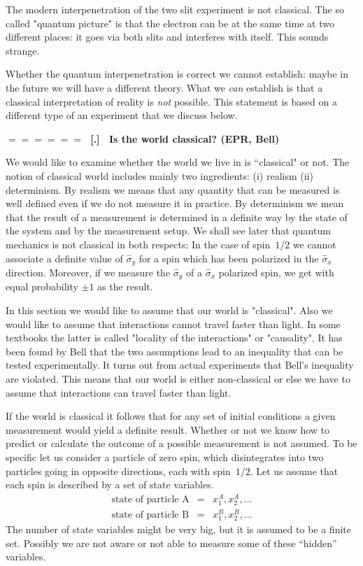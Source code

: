 \documentclass[onecolumn,fleqn]{revtex4}
\newcommand{\beq}{\begin{eqnarray}}
\newcommand{\eeq}{\end{eqnarray}}
\renewcommand{\thesubsection}{\arabic{subsection}}
\renewcommand{\thesubsubsection}{\arabic{subsubsection}}
\newcommand{\sheadC}[1]
{
\addtocounter{subsubsection}{1}
\vspace{5mm}
{\Large\bf $=\!=\!=\!=\!=\!=\;$ [\thesubsection.\thesubsubsection] \ #1}  
\nopagebreak
\phantomsection
}
\begin{document}
The modern interpenetration of the two slit experiment is not classical. 
The so called "quantum picture" is that the electron can be at the same time at two different places:
it goes via both slits and interferes with itself. This sounds strange. 

Whether the quantum interpenetration is correct we cannot establish:
maybe in the future we will have a different theory.
What we {\em can} establish is that a classical interpretation
of reality is {\em not} possible. This statement is based on 
a different type of an experiment that we discuss below.   
  

\sheadC{Is the world classical? (EPR, Bell)}


We would like to examine whether the world we live 
in is ``classical" or not. The notion of 
classical world includes mainly two ingredients: 
(i) realism (ii) determinism.  
By realism we means that any quantity that can 
be measured is well defined even if we do not 
measure it in practice. By determinism we mean 
that the result of a measurement is determined 
in a definite way by the state of the system 
and by the measurement setup. We shall see later 
that quantum mechanics is not classical in both 
respects: In the case of spin~$1/2$ we cannot 
associate a definite value of $\hat{\sigma}_y$ 
for a spin which has been polarized in the $\hat{\sigma}_x$  
direction. Moreover, if we measure the $\hat{\sigma}_y$
of a $\hat{\sigma}_x$ polarized spin, 
we get with equal probability $\pm1$ as the result.
 
In this section we would like to assume that our 
world is "classical". Also we would like to assume    
that interactions cannot travel faster than light.  
In some textbooks the latter is called "locality 
of the interactions" or "causality". It has been found 
by Bell that the two assumptions lead to an inequality 
that can be tested experimentally. It turns out 
from actual experiments that Bell's inequality are violated. 
This means that our world is either non-classical or else we have 
to assume that interactions can travel faster than light.  


If the world is classical it follows  
that for any set of initial conditions 
a given measurement would yield a definite result. 
Whether or not we know how to predict or calculate 
the outcome of a possible measurement is not assumed.
To be specific let us consider a particle of zero spin, 
which disintegrates into two particles going
in opposite directions, each with spin~$1/2$. 
Let us assume that each spin is described 
by a set of state variables. 
\beq
\mbox{state of particle A} &=&  x^A_1, x^A_2, ... 
\\ \nonumber
\mbox{state of particle B} &=&  x^B_1, x^B_2, ...
\eeq
The number of state variables might be very big,
but it is assumed to be a finite set. Possibly we 
are not aware or not able to measure some of these ``hidden'' variables.
\end{document}
